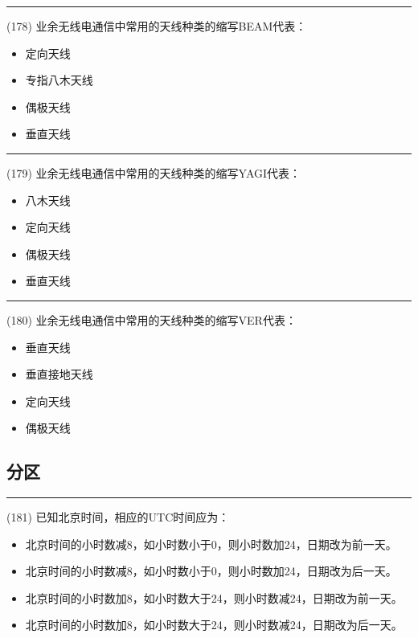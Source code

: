 \documentclass[twocolumn,hyperref,UTF8]{ctexart}  %
\begin{document}
\noindent\rule{0.5\textwidth}{1pt}
\heiti (178) 业余无线电通信中常用的天线种类的缩写BEAM代表： \songti {\color{gray} [LK0408] }
\begin{itemize}
	\item  定向天线
	\item  专指八木天线
	\item  偶极天线
	\item  垂直天线
\end{itemize}


\noindent\rule{0.5\textwidth}{1pt}
\heiti (179) 业余无线电通信中常用的天线种类的缩写YAGI代表： \songti {\color{gray} [LK0409] }
\begin{itemize}
	\item  八木天线
	\item  定向天线
	\item  偶极天线
	\item  垂直天线
\end{itemize}


\noindent\rule{0.5\textwidth}{1pt}
\heiti (180) 业余无线电通信中常用的天线种类的缩写VER代表： \songti {\color{gray} [LK0410] }
\begin{itemize}
	\item  垂直天线
	\item  垂直接地天线
	\item  定向天线
	\item  偶极天线
\end{itemize}





\clearpage
\subsection{分区}


\noindent\rule{0.5\textwidth}{1pt}
\heiti (181) 已知北京时间，相应的UTC时间应为： \songti {\color{gray} [LK0193] }
\begin{itemize}
	\item  北京时间的小时数减8，如小时数小于0，则小时数加24，日期改为前一天。
	\item  北京时间的小时数减8，如小时数小于0，则小时数加24，日期改为后一天。
	\item  北京时间的小时数加8，如小时数大于24，则小时数减24，日期改为前一天。
	\item  北京时间的小时数加8，如小时数大于24，则小时数减24，日期改为后一天。
\end{itemize}
\end{document}
